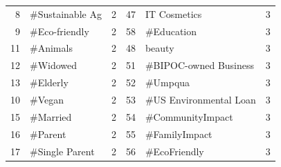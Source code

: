 \begin{longtable}{|r|l|l|r|l|l|}
	8                                 & \#Sustainable Ag                   & 2                                                       & 47                               & IT Cosmetics                        & 3                                                      \\
	9                                 & \#Eco-friendly                     & 2                                                       & 58                               & \#Education                         & 3                                                      \\
	11                                & \#Animals                          & 2                                                       & 48                               & beauty                              & 3                                                      \\
	12                                & \#Widowed                          & 2                                                       & 51                               & \#BIPOC-owned Business              & 3                                                      \\
	13                                & \#Elderly                          & 2                                                       & 52                               & \#Umpqua                            & 3                                                      \\
	10                                & \#Vegan                            & 2                                                       & 53                               & \#US Environmental Loan             & 3                                                      \\
	15                                & \#Married                          & 2                                                       & 54                               & \#CommunityImpact                   & 3                                                      \\
	16                                & \#Parent                           & 2                                                       & 55                               & \#FamilyImpact                      & 3                                                      \\
	17                                & \#Single Parent                    & 2                                                       & 56                               & \#EcoFriendly                       & 3                                                      \\

\end{longtable}
